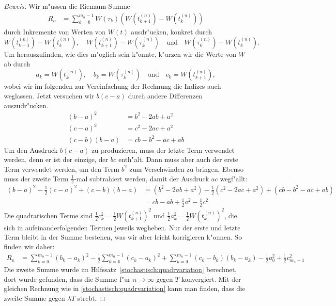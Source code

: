 \begin{proof}[Beweis]
Wir m"ussen die Riemann-Summe
\begin{align*}
R_n
&=
\sum_{k=0}^{m_n-1}
W(\tau_k) (W(t_{k+1}^{(n)})-W(t_k^{(n)}))
\end{align*}
durch Inkremente von Werten von $W(t)$ ausdr"ucken, konkret durch
\[
W(t_{k+1}^{(n)})-W(t_k^{(n)}),\quad
W(t_{k+1}^{(n)})-W(\tau_k^{(n)})
\quad \text{und} \quad
W(\tau_k^{(n)})-W(t_k^{(n)}).
\]
Um herauszufinden, wie dies m"oglich sein k"onnte, k"urzen wir die Werte
von $W$ ab durch
\[
a_k=W(t_k^{(n)}),\quad
b_k=W(\tau_k^{(n)})\quad\text{und}\quad
c_k=W(t_{k+1}^{(n)}),
\]
wobei wir im folgenden zur Vereinfachung der Rechnung die Indizes auch
weglassen.
Jetzt versuchen wir $b(c-a)$ durch andere Differenzen auszudr"ucken.
\begin{align*}
(b-a)^2
&=
b^2-2ab + a^2
\\
(c-a)^2
&=
c^2-2ac+a^2
\\
(c-b)(b-a)
&=
cb-b^2-ac+ab
\end{align*}
Um den Ausdruck $b(c-a)$ zu produzieren, muss der letzte Term verwendet
werden, denn er ist der einzige, der $bc$ enth"alt.
Dann muss aber auch der erste Term verwendet werden, um den Term $b^2$ zum
Verschwinden  zu bringen.
Ebenso muss der zweite Term $\frac12$-mal subtrahiert werden, damit der
Ausdruck $ac$ wegf"allt:
\begin{align*}
(b-a)^2-\frac12(c-a)^2+(c-b)(b-a)
&=
(b^2-2ab + a^2)
-\frac12(c^2-2ac+a^2)
+(cb-b^2-ac+ab)
\\
&=
cb-ab + \frac12a^2
-\frac12c^2
\end{align*}
Die quadratischen Terme sind $\frac12c_k^2=\frac12W(t_{k+1}^{(n)})^2$ und
$\frac12a_k^2=\frac12W(t_{k}^{(n)})^2$, die sich in aufeinanderfolgenden Termen
jeweils wegheben.
Nur der erste und letzte Term bleibt in der Summe bestehen, was wir
aber leicht korrigieren k"onnen.
So finden wir daher:
\begin{align*}
R_n
&=
\sum_{k=0}^{m_n-1} (b_k-a_k)^2
-\frac12\sum_{k=0}^{m_n-1} (c_k-a_k)^2
+\sum_{k=0}^{m_n-1} (c_k-b_k)(b_k-a_k)
- \frac12a_0^2
+ \frac12c_{m_n-1}^2
\end{align*}
Die zweite Summe wurde im Hilfssatz~\ref{stochastisch:quadrvariation}
berechnet, dort wurde gefunden, dass die Summe f"ur $n\to\infty$ gegen $T$
konvergiert.
Mit der gleichen Rechnung wie in \ref{stochastisch:quadrvariation}
kann man finden, dass die zweite Summe gegen $\lambda T$ strebt.


\end{proof}
